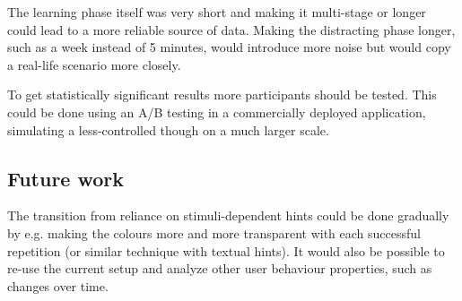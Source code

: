 The learning phase itself was very short and making it multi-stage or longer could lead to a more reliable source of data.
Making the distracting phase longer, such as a week instead of 5 minutes, would introduce more noise but would copy a real-life scenario more closely.

To get statistically significant results more participants should be tested.
This could be done using an A/B testing in a commercially deployed application, simulating a less-controlled though on a much larger scale.

\subsection{Future work}

The transition from reliance on stimuli-dependent hints could be done gradually by e.g. making the colours more and more transparent with each successful repetition (or similar technique with textual hints).
It would also be possible to re-use the current setup and analyze other user behaviour properties, such as changes over time.